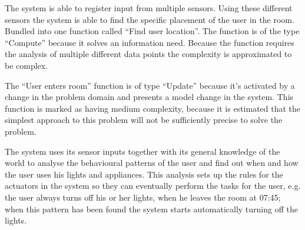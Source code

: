 The system is able to register input from multiple sensors. Using these different sensors the system is able to find the specific placement of the user in the room. Bundled into one function called \enquote{Find user location}. The function is of the type \enquote{Compute} because it solves an information need. Because the function requires the analysis of multiple different data points the complexity is approximated to be complex.

The \enquote{User enters room} function is of type \enquote{Update} because it's activated by a change in the problem domain and presents a model change in the system. This function is marked as having medium complexity, because it is estimated that the simplest approach to this problem will not be sufficiently precise to solve the problem.

The system uses its sensor inputs together with its general knowledge of the world to analyse the behavioural patterns of the user and find out when and how the user uses his lights and appliances. This analysis sets up the rules for the actuators in the system so they can eventually perform the tasks for the user, e.g. the user always turns off his or her lights, when he leaves the room at 07:45; when this pattern has been found the system starts automatically turning off the lights.
